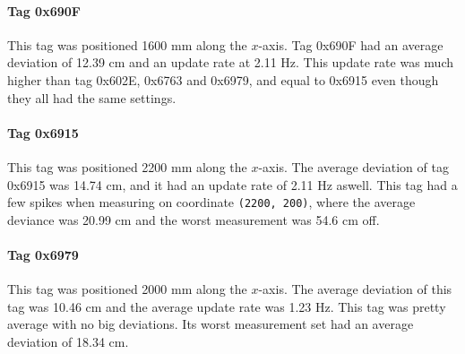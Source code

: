 \paragraph{Tag 0x690F}
This tag was positioned 1600 mm along the $x$-axis.
Tag 0x690F had an average deviation of 12.39 cm and an update rate at 2.11 Hz.
This update rate was much higher than tag 0x602E, 0x6763 and 0x6979, and equal to 0x6915 even though they all had the same settings.

\paragraph{Tag 0x6915}
This tag was positioned 2200 mm along the $x$-axis.
The average deviation of tag 0x6915 was 14.74 cm, and it had an update rate of 2.11 Hz aswell.
This tag had a few spikes when measuring on coordinate \texttt{(2200, 200)}, where the average deviance was 20.99 cm and the worst measurement was 54.6 cm off.

\paragraph{Tag 0x6979}
This tag was positioned 2000 mm along the $x$-axis.
The average deviation of this tag was 10.46 cm and the average update rate was 1.23 Hz.
This tag was pretty average with no big deviations.
Its worst measurement set had an average deviation of 18.34 cm.


